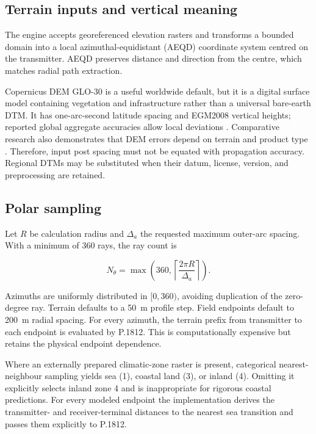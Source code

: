\documentclass[10pt,a4paper,twocolumn]{article}
\begin{document}
\subsection{Terrain inputs and vertical meaning}

The engine accepts georeferenced elevation rasters and transforms a bounded
domain into a local azimuthal-equidistant (AEQD) coordinate system centred on
the transmitter. AEQD preserves distance and direction from the centre, which
matches radial path extraction.

Copernicus DEM GLO-30 is a useful worldwide default, but it is a digital surface
model containing vegetation and infrastructure rather than a universal
bare-earth DTM. It has one-arc-second latitude spacing and EGM2008 vertical
heights; reported global aggregate accuracies allow local deviations
\cite{copernicusdem}. Comparative research also demonstrates that DEM errors
depend on terrain and product type \cite{maresova2021}. Therefore, input post
spacing must not be equated with propagation accuracy. Regional DTMs may be
substituted when their datum, license, version, and preprocessing are retained.

\subsection{Polar sampling}

Let $R$ be calculation radius and $\Delta_a$ the requested maximum outer-arc
spacing. With a minimum of 360 rays, the ray count is

\begin{equation}
N_\theta = \max\left(360,
  \left\lceil\frac{2\pi R}{\Delta_a}\right\rceil\right).
\label{eq:rays}
\end{equation}

Azimuths are uniformly distributed in $[0,360)$, avoiding duplication of the
zero-degree ray. Terrain defaults to a \SI{50}{\meter} profile step. Field
endpoints default to \SI{200}{\meter} radial spacing. For every azimuth, the
terrain prefix from transmitter to each endpoint is evaluated by P.1812. This
is computationally expensive but retains the physical endpoint dependence.

Where an externally prepared climatic-zone raster is present, categorical
nearest-neighbour sampling yields sea (1), coastal land (3), or inland (4).
Omitting it explicitly selects inland zone 4 and is inappropriate for rigorous
coastal predictions. For every modeled endpoint the implementation derives the
transmitter- and receiver-terminal distances to the nearest sea transition and
passes them explicitly to P.1812.
\end{document}
